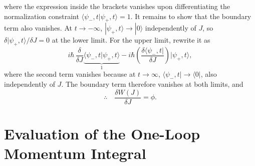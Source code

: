 where the expression inside the brackets vanishes upon differentiating the
normalization constraint $\langle\psi_-,t|\psi_+,t\rangle = 1$. It
remains to show that the boundary term also vanishes. At $t\to-\infty$,
$|\psi_+,t\rangle\to|0\rangle$ independently of $J$, so
$\delta|\psi_+,t\rangle/\delta J = 0$ at the lower limit. For the upper
limit, rewrite it as
\begin{equation}
	i\hbar\,\frac{\delta}{\delta J}
	\underbrace{\langle\psi_-,t|\psi_+,t\rangle}_{1}
	- i\hbar\left(\frac{\delta\langle\psi_-,t|}{\delta J}\right)|\psi_+,t\rangle,
\end{equation}
where the second term vanishes because at $t\to\infty$,
$\langle\psi_-,t|\to\langle 0|$, also independently of $J$. The boundary
term therefore vanishes at both limits, and
\begin{equation}
	\therefore\quad\boxed{\frac{\delta W(J)}{\delta J} = \phi.}
\end{equation}




\chapter{Evaluation of the One-Loop Momentum Integral}
\label{app:oneloop-integral}

